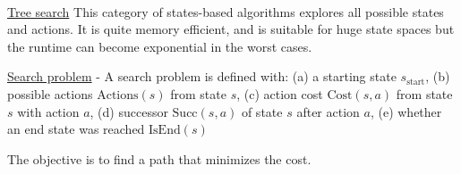 \documentclass[4pt,landscape]{article}
\begin{document}
\begin{multicols*}{4}

{\color{cyan}\hrulefill}\\
\underline{Tree search}
{This category of states-based algorithms explores all possible states and actions. It is quite memory efficient, and is suitable for huge state spaces but the runtime can become exponential in the worst cases.}\par

{\tiny \underline{Search problem} - A search problem is defined with: (a) a starting state $s_{\textrm{start}}$, (b) possible actions $\textrm{Actions}(s)$ from state $s$, (c) action cost $\textrm{Cost}(s,a)$ from state $s$ with action $a$, (d) successor $\textrm{Succ}(s,a)$ of state $s$ after action $a$, (e) whether an end state was reached $\textrm{IsEnd}(s)$
}\par

{The objective is to find a path that minimizes the cost.}\par
\columnbreak






\end{multicols*}
\end{document}
